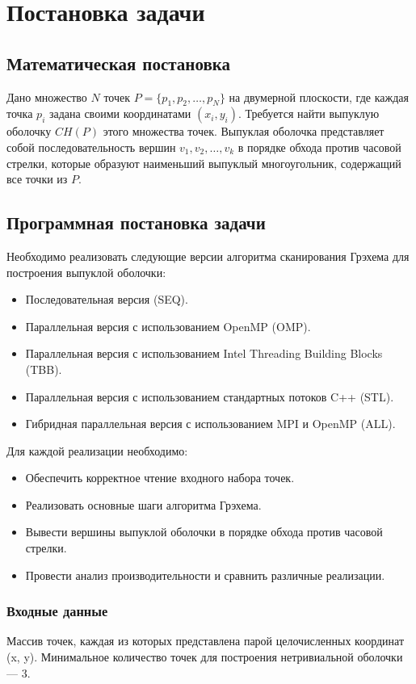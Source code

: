 \documentclass[12pt]{article}
\begin{document}
\newpage
\section{Постановка задачи}
\subsection{Математическая постановка}
Дано множество $N$ точек $P = \{p_1, p_2, \dots, p_N\}$ на двумерной плоскости, где каждая точка $p_i$ задана своими координатами $(x_i, y_i)$.
Требуется найти выпуклую оболочку $CH(P)$ этого множества точек. Выпуклая оболочка представляет собой последовательность вершин $v_1, v_2, \dots, v_k$ в порядке обхода против часовой стрелки, которые образуют наименьший выпуклый многоугольник, содержащий все точки из $P$.

\subsection{Программная постановка задачи}
Необходимо реализовать следующие версии алгоритма сканирования Грэхема для построения выпуклой оболочки:
\begin{itemize}
    \item Последовательная версия (SEQ).
    \item Параллельная версия с использованием OpenMP (OMP).
    \item Параллельная версия с использованием Intel Threading Building Blocks (TBB).
    \item Параллельная версия с использованием стандартных потоков C++ (STL).
    \item Гибридная параллельная версия с использованием MPI и OpenMP (ALL).
\end{itemize}

Для каждой реализации необходимо:
\begin{itemize}
    \item Обеспечить корректное чтение входного набора точек.
    \item Реализовать основные шаги алгоритма Грэхема.
    \item Вывести вершины выпуклой оболочки в порядке обхода против часовой стрелки.
    \item Провести анализ производительности и сравнить различные реализации.
\end{itemize}

\subsubsection{Входные данные}
Массив точек, каждая из которых представлена парой целочисленных координат (x, y). Минимальное количество точек для построения нетривиальной оболочки --- 3.
\end{document}
